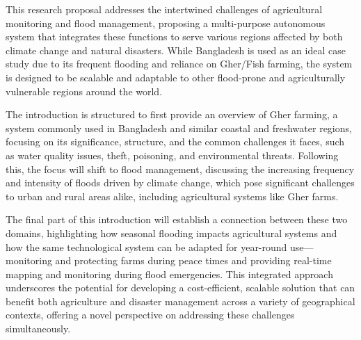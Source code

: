 \documentclass[conference]{IEEEtran}
\begin{document}
This research proposal addresses the intertwined challenges of agricultural monitoring and flood management, proposing a multi-purpose autonomous system that integrates these functions to serve various regions affected by both climate change and natural disasters. While Bangladesh is used as an ideal case study due to its frequent flooding and reliance on Gher/Fish farming, the system is designed to be scalable and adaptable to other flood-prone and agriculturally vulnerable regions around the world.

The introduction is structured to first provide an overview of Gher farming, a system commonly used in Bangladesh and similar coastal and freshwater regions, focusing on its significance, structure, and the common challenges it faces, such as water quality issues, theft, poisoning, and environmental threats. Following this, the focus will shift to flood management, discussing the increasing frequency and intensity of floods driven by climate change, which pose significant challenges to urban and rural areas alike, including agricultural systems like Gher farms.

The final part of this introduction will establish a connection between these two domains, highlighting how seasonal flooding impacts agricultural systems and how the same technological system can be adapted for year-round use—monitoring and protecting farms during peace times and providing real-time mapping and monitoring during flood emergencies. This integrated approach underscores the potential for developing a cost-efficient, scalable solution that can benefit both agriculture and disaster management across a variety of geographical contexts, offering a novel perspective on addressing these challenges simultaneously.
\end{document}
